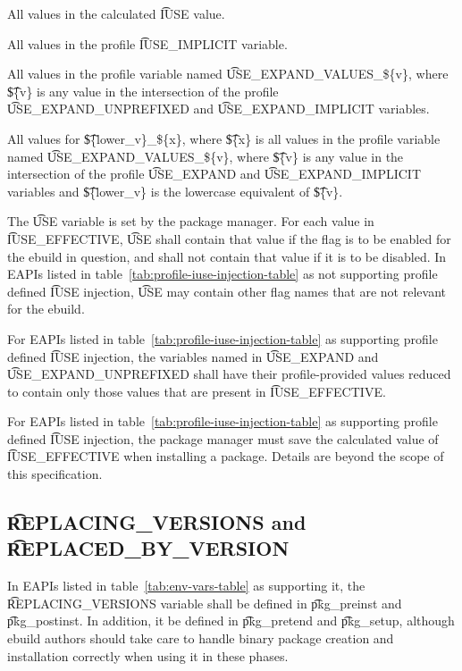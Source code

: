 \begin{compactitem}
\item All values in the calculated \t{IUSE} value.
\item All values in the profile \t{IUSE\_IMPLICIT} variable.
\item All values in the profile variable named \t{USE\_EXPAND\_VALUES\_\$\{v\}}, where \t{\$\{v\}}
    is any value in the intersection of the profile \t{USE\_EXPAND\_UNPREFIXED} and
    \t{USE\_EXPAND\_IMPLICIT} variables.
\item All values for \t{\$\{lower\_v\}\_\$\{x\}}, where \t{\$\{x\}} is all values in the profile
    variable named \t{USE\_EXPAND\_VALUES\_\$\{v\}}, where \t{\$\{v\}} is any value in the
    intersection of the profile \t{USE\_EXPAND} and \t{USE\_EXPAND\_IMPLICIT} variables and
    \t{\$\{lower\_v\}} is the lowercase equivalent of \t{\$\{v\}}.
\end{compactitem}

The \t{USE} variable is set by the package manager. For each value in \t{IUSE\_EFFECTIVE}, \t{USE}
shall contain that value if the flag is to be enabled for the ebuild in question, and shall not
contain that value if it is to be disabled. In EAPIs listed in
table~\ref{tab:profile-iuse-injection-table} as not supporting profile defined \t{IUSE} injection,
\t{USE} may contain other flag names that are not relevant for the ebuild.

For EAPIs listed in table~\ref{tab:profile-iuse-injection-table} as supporting profile defined
\t{IUSE} injection, the variables named in \t{USE\_EXPAND} and \t{USE\_EXPAND\_UNPREFIXED} shall
have their profile-provided values reduced to contain only those values that are present in
\t{IUSE\_EFFECTIVE}.

For EAPIs listed in table~\ref{tab:profile-iuse-injection-table} as supporting profile defined
\t{IUSE} injection, the package manager must save the calculated value of \t{IUSE\_EFFECTIVE} when
installing a package. Details are beyond the scope of this specification.

\subsection{\t{REPLACING\_VERSIONS} and \t{REPLACED\_BY\_VERSION}}
\label{sec:replacing-versions}

 In EAPIs listed in table~\ref{tab:env-vars-table} as supporting
it, the \t{REPLACING\_VERSIONS} variable shall be defined in \t{pkg\_preinst} and \t{pkg\_postinst}.
In addition, it  be defined in \t{pkg\_pretend} and \t{pkg\_setup}, although ebuild authors
should take care to handle binary package creation and installation correctly when using it in these
phases.

